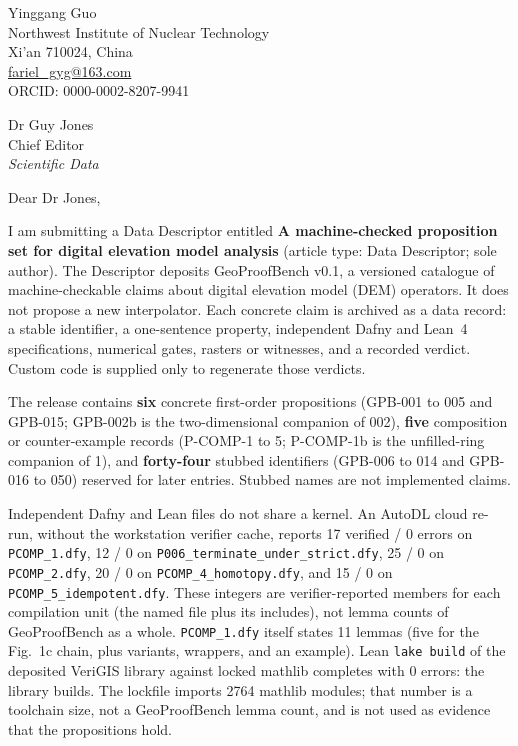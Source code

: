 \documentclass[11pt,a4paper]{article}
\begin{document}
\noindent
Yinggang Guo\\
Northwest Institute of Nuclear Technology\\
Xi'an 710024, China\\
\url{fariel_gyg@163.com}\\
ORCID: 0000-0002-8207-9941

\vspace{1.0em}
\noindent
Dr Guy Jones\\
Chief Editor\\
\textit{Scientific Data}

\vspace{0.8em}
\noindent
Dear Dr Jones,

\vspace{0.4em}
I am submitting a Data Descriptor entitled
\textbf{A machine-checked proposition set for digital elevation model analysis}
(article type: Data Descriptor; sole author).
The Descriptor deposits GeoProofBench v0.1, a versioned catalogue of
machine-checkable claims about digital elevation model (DEM) operators.
It does not propose a new interpolator.
Each concrete claim is archived as a data record: a stable identifier,
a one-sentence property, independent Dafny and Lean~4 specifications,
numerical gates, rasters or witnesses, and a recorded verdict.
Custom code is supplied only to regenerate those verdicts.

The release contains \textbf{six} concrete first-order propositions
(GPB-001 to 005 and GPB-015; GPB-002b is the two-dimensional companion of 002),
\textbf{five} composition or counter-example records
(P-COMP-1 to 5; P-COMP-1b is the unfilled-ring companion of 1),
and \textbf{forty-four} stubbed identifiers
(GPB-006 to 014 and GPB-016 to 050) reserved for later entries.
Stubbed names are not implemented claims.

Independent Dafny and Lean files do not share a kernel.
An AutoDL cloud re-run, without the workstation verifier cache, reports
17 verified / 0 errors on \texttt{PCOMP\_1.dfy},
12 / 0 on \texttt{P006\_terminate\_under\_strict.dfy},
25 / 0 on \texttt{PCOMP\_2.dfy},
20 / 0 on \texttt{PCOMP\_4\_homotopy.dfy},
and 15 / 0 on \texttt{PCOMP\_5\_idempotent.dfy}.
These integers are verifier-reported members for each compilation unit
(the named file plus its includes), not lemma counts of GeoProofBench as a
whole. \texttt{PCOMP\_1.dfy} itself states 11 lemmas (five for the
Fig.~1c chain, plus variants, wrappers, and an example).
Lean \texttt{lake build} of the deposited VeriGIS library against locked mathlib
completes with 0 errors: the library builds.
The lockfile imports 2764 mathlib modules; that number is a toolchain size,
not a GeoProofBench lemma count, and is not used as evidence that the
propositions hold.
\end{document}
